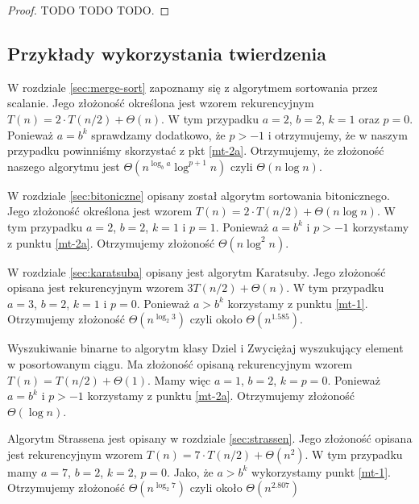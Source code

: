 \begin{proof}
 TODO TODO TODO.
\end{proof}

\subsection{Przykłady wykorzystania twierdzenia}

W rozdziale \ref{sec:merge-sort} zapoznamy się z algorytmem sortowania przez scalanie.
Jego złożoność określona jest wzorem rekurencyjnym $T(n) = 2 \cdot T(n/2) + \Theta(n)$.
W tym przypadku $a = 2$, $b = 2$, $k = 1$ oraz $p = 0$.
Ponieważ $a = b^k$ sprawdzamy dodatkowo, że $p > -1$ i otrzymujemy, że w naszym przypadku powinniśmy skorzystać z pkt \ref{mt-2a}.
Otrzymujemy, że złożoność naszego algorytmu jest $\Theta(n^{\log_b a} \log^{p + 1} n)$ czyli $\Theta(n\log n)$.

W rozdziale \ref{sec:bitoniczne} opisany został algorytm sortowania bitonicznego.
Jego złożoność określona jest wzorem $T(n) = 2 \cdot T(n/2) + \Theta(n \log n)$.
W tym przypadku $a = 2$, $b = 2$, $k=1$ i $p = 1$.
Ponieważ $a = b^k$ i $p > -1$ korzystamy z punktu \ref{mt-2a}.
Otrzymujemy złożoność $\Theta(n \log^2 n)$.

W rozdziale \ref{sec:karatsuba} opisany jest algorytm Karatsuby. Jego złożoność opisana jest rekurencyjnym wzorem $3 T(n/2) + \Theta(n)$.
W tym przypadku $a = 3$, $b = 2$, $k=1$ i $p=0$.
Ponieważ $a > b^k$ korzystamy z punktu \ref{mt-1}.
Otrzymujemy złożoność $\Theta(n^{\log_{2} 3})$ czyli około $\Theta(n^{1.585}).$

Wyszukiwanie binarne to algorytm klasy Dziel i Zwyciężaj wyszukujący element w posortowanym ciągu.
Ma złożoność opisaną rekurencyjnym wzorem $T(n) = T(n/2) + \Theta(1)$.
Mamy więc $a = 1$, $b = 2$, $k = p = 0$.
Ponieważ $a = b^k$ i $p > -1$ korzystamy z punktu \ref{mt-2a}.
Otrzymujemy złożoność $\Theta(\log n)$.

Algorytm Strassena jest opisany w rozdziale \ref{sec:strassen}.
Jego złożoność opisana jest rekurencyjnym wzorem $T(n) = 7 \cdot T(n/2) + \Theta(n^2)$.
W tym przypadku mamy $a = 7$, $b = 2$, $k = 2$, $p = 0$.
Jako, że $a > b^k$ wykorzystamy punkt \ref{mt-1}.
Otrzymujemy złożoność $\Theta(n^{\log_{2} 7})$ czyli około $\Theta(n^{2.807})$
